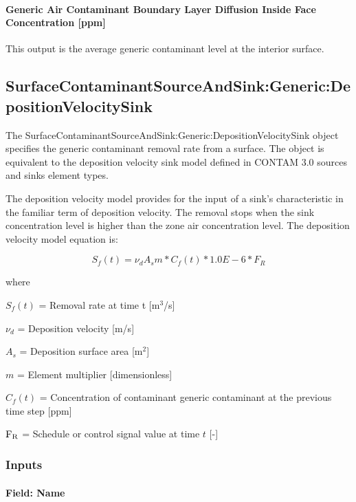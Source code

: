 \paragraph{Generic Air Contaminant Boundary Layer Diffusion Inside Face Concentration {[}ppm{]}}\label{generic-air-contaminant-boundary-layer-diffusion-inside-face-concentration-ppm}

This output is the average generic contaminant level at the interior surface.

\subsection{Sur\-face\-Contaminant\-Source\-And\-Sink:\-Generic:\-Deposition\-Velocity\-Sink}\label{surfacecontaminantsourceandsinkgenericdepositionvelocitysink}

The Sur\-face\-Contaminant\-Source\-And\-Sink:\-Generic:\-Deposition\-Velocity\-Sink object specifies the generic contaminant removal rate from a surface. The object is equivalent to the deposition velocity sink model defined in CONTAM 3.0 sources and sinks element types.

The deposition velocity model provides for the input of a sink's characteristic in the familiar term of deposition velocity. The removal stops when the sink concentration level is higher than the zone air concentration level. The deposition velocity model equation is:

\begin{equation}
{S_f}(t) = {\nu_d}{A_s}m*{C_f}(t)*1.0E - 6*F{}_R
\end{equation}

where

\(S_f (t)\) = Removal rate at time t {[}m\(^{3}\)/s{]}

\(\nu_d\) = Deposition velocity {[}m/s{]}

\(A_s\) = Deposition surface area {[}m\(^{2}\){]}

\(m\) = Element multiplier {[}dimensionless{]}

\(C_f (t)\) = Concentration of contaminant generic contaminant at the previous time step {[}ppm{]}

\(\rm{F}_{R}\) = Schedule or control signal value at time \(t\) {[}-{]}

\subsubsection{Inputs}\label{inputs-16-005}

\paragraph{Field: Name}\label{field-name-16-004}

